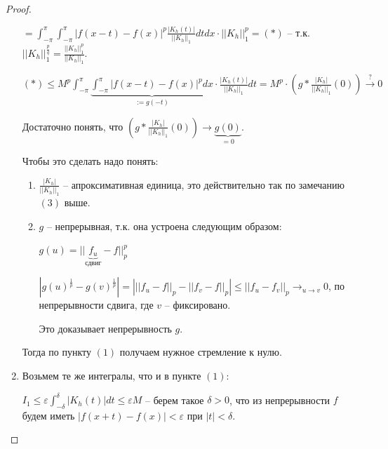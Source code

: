 \begin{proof}
\begin{enumerate}
{            $= \int_{-\pi}^{\pi} \int_{-\pi}^{\pi} |f(x-t)-f(x)|^p \frac{|K_h(t)|}{|| K_h ||_1} dt dx \cdot ||K_h||_1^p = (*)$ -- т.к. $||K_h||_1^{\frac{p}{q}} = \frac{||K_h||_1^{p}}{||K_h||_1}$.

            $(*) \leq M^p \int_{-\pi}^{\pi} \underbrace{\int_{-\pi}^{\pi} |f(x-t)-f(x)|^p dx}_{:= g(-t)} \cdot \frac{|K_h(t)|}{||K_h||_1} dt = M^p \cdot \left( g * \frac{|K_h|}{||K_h||_1} (0) \right) \overset{?}{\to} 0$

            Достаточно понять, что $\left( g * \frac{|K_h|}{||K_h||_1} (0) \right) \to \underbrace{g(0)}_{=0}$.

            Чтобы это сделать надо понять:
            
            \begin{enumerate}
                \item $\frac{|K_h|}{||K_h||_1}$ -- апроксимативная единица, это действительно так по замечанию $(3)$ выше.
                \item {
                    $g$ -- непрерывная, т.к. она устроена следующим образом:

                    $g(u) = || \underbrace{f_u}_{\text{сдвиг}} - f ||_p^p$

                    $|g(u)^{\frac{1}{p}} - g(v)^{\frac{1}{p}}| = \left| ||f_u - f||_p - ||f_v - f||_p \right| \leq ||f_u - f_v||_p \to_{u \to v} 0$, по непрерывности сдвига, где $v$ -- фиксировано.

                    Это доказывает непрерывность $g$.
                }
            \end{enumerate}

            Тогда по пункту $(1)$ получаем нужное стремление к нулю.
        }
        \item {


            Возьмем те же интегралы, что и в пункте $(1)$:

            $I_1 \leq \varepsilon \int_{-\delta}^{\delta} |K_h(t)| dt \leq \varepsilon M$ -- берем такое $\delta > 0$, что из непрерывности $f$ будем иметь $|f(x + t) - f(x)| < \varepsilon$ при $|t| < \delta$.

}
\end{enumerate}
\end{proof}
